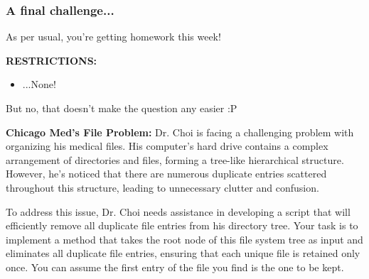 \documentclass[hyperref={colorlinks,citecolor=blue,linkcolor=blue,urlcolor=blue}, aspectratio=1610]{beamer}
\begin{document}
\begin{frame}
  \frametitle{A final challenge...}
As per usual, you're getting homework this week! 
\begin{center}
  \textbf{RESTRICTIONS:}
  \begin{itemize}
    \item ...None!
  \end{itemize}  
  But no, that doesn't make the question any easier :P
\end{center}

\textbf{Chicago Med's File Problem:} Dr. Choi is facing a challenging problem with organizing his medical files. His computer's hard drive contains a complex arrangement of directories and files, forming a tree-like hierarchical structure. However, he's noticed that there are numerous duplicate entries scattered throughout this structure, leading to unnecessary clutter and confusion.

To address this issue, Dr. Choi needs assistance in developing a script that will efficiently remove all duplicate file entries from his directory tree. Your task is to implement a method that takes the root node of this file system tree as input and eliminates all duplicate file entries, ensuring that each unique file is retained only once. You can assume the first entry of the file you find is the one to be kept.


\end{frame}
\end{document}
